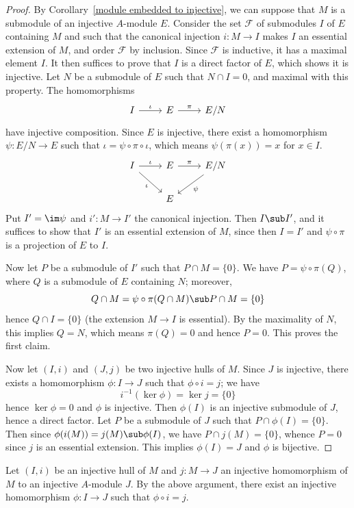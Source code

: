 \begin{proof}
By Corollary~\ref{module embedded to injective}, we can suppose that $M$ is a submodule of an injective $A$-module $E$. Consider the set $\mathscr{F}$ of submodules $I$ of $E$ containing $M$ and such that the canonical injection $i:M\to I$ makes $I$ an essential extension of $M$, and order $\mathscr{F}$ by inclusion. Since $\mathscr{F}$ is inductive, it has a maximal element $I$. It then suffices to prove that $I$ is a direct factor of $E$, which shows it is injective. Let $N$ be a submodule of $E$ such that $N\cap I=0$, and maximal with this property. The homomorphisms
\[\begin{tikzcd}
I\ar[r,"\iota"]&E\ar[r,"\pi"]&E/N
\end{tikzcd}\]
have injective composition. Since $E$ is injective, there exist a homomorphism $\psi:E/N\to E$ such that $\iota=\psi\circ\pi\circ\iota$, which means $\psi(\pi(x))=x$ for $x\in I$. 
\[\begin{tikzcd}
I\ar[rd,swap,"\iota"]\ar[r,"\iota"]&E\ar[r,"\pi"]&E/N\ar[ld,"\psi"]\\
&E&
\end{tikzcd}\]
Put $I'=\im\psi$ and $i':M\to I'$ the canonical injection. Then $I\sub I'$, and it suffices to show that $I'$ is an essential extension of $M$, since then $I=I'$ and $\psi\circ\pi$ is a projection of $E$ to $I$.\par
Now let $P$ be a submodule of $I'$ such that $P\cap M=\{0\}$. We have $P=\psi\circ\pi(Q)$, where $Q$ is a submodule of $E$ containing $N$; moreover,
\[Q\cap M=\psi\circ\pi(Q\cap M)\sub P\cap M=\{0\}\]
hence $Q\cap I=\{0\}$ (the extension $M\to I$ is essential). By the maximality of $N$, this implies $Q=N$, which means $\pi(Q)=0$ and hence $P=0$. This proves the first claim.\par
Now let $(I,i)$ and $(J,j)$ be two injective hulls of $M$. Since $J$ is injective, there exists a homomorphism $\phi:I\to J$ such that $\phi\circ i=j$; we have
\[i^{-1}(\ker\phi)=\ker j=\{0\}\]
hence $\ker\phi=0$ and $\phi$ is injective. Then $\phi(I)$ is an injective submodule of $J$, hence a direct factor. Let $P$ be a submodule of $J$ such that $P\cap\phi(I)=\{0\}$. Then since $\phi(i(M))=j(M)\sub\phi(I)$, we have $P\cap j(M)=\{0\}$, whence $P=0$ since $j$ is an essential extension. This implies $\phi(I)=J$ and $\phi$ is bijective. 
\end{proof}
\begin{remark}\label{module injective hull smallese injective embedd}
Let $(I,i)$ be an injective hull of $M$ and $j:M\to J$ an injective homomorphism of $M$ to an injective $A$-module $J$. By the above argument, there exist an injective homomorphism $\phi:I\to J$ such that $\phi\circ i=j$.
\end{remark}
